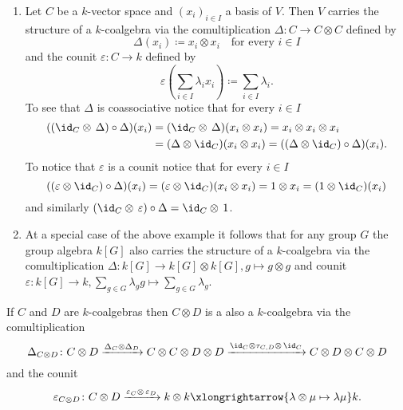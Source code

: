 \begin{expls}
 \begin{enumerate}[leftmargin=*]
  \item
   Let $C$ be a $k$-vector space and $(x_i)_{i \in I}$ a basis of $V$. Then $V$ carries the structure of a $k$-coalgebra via the comultiplication $\Delta \colon C \to C \otimes C$ defined by
   \[
    \Delta(x_i) \coloneqq x_i \otimes x_i \quad \text{for every $i \in I$}
   \]
   and the counit $\varepsilon \colon C \to k$ defined by
   \[
    \varepsilon\left( \sum_{i \in I} \lambda_i x_i \right) \coloneqq \sum_{i \in I} \lambda_i.
   \]
   To see that $\Delta$ is coassociative notice that for every $i \in I$
   \begin{align*}
     ((\id_C \otimes\, \Delta) \circ \Delta)(x_i)
     &= (\id_C \otimes\, \Delta)(x_i \otimes x_i)
     = x_i \otimes x_i \otimes x_i \\
     &= (\Delta \otimes \id_C)(x_i \otimes x_i)
     = ((\Delta \otimes \id_C) \circ \Delta)(x_i).
   \end{align*}
   To notice that $\varepsilon$ is a counit notice that for every $i \in I$
   \[
     ((\varepsilon \otimes \id_C) \circ \Delta)(x_i)
     = (\varepsilon \otimes \id_C)(x_i \otimes x_i)
     = 1 \otimes x_i
     = (1 \otimes \id_C)(x_i)
   \]
   and similarly $(\id_C \otimes\, \varepsilon) \circ \Delta = \id_C \otimes\, 1$.
   
  \item
   At a special case of the above example it follows that for any group $G$ the group algebra $k[G]$ also carries the structure of a $k$-coalgebra via the comultiplication $\Delta \colon k[G] \to k[G] \otimes k[G], g \mapsto g \otimes g$ and counit $\varepsilon \colon k[G] \to k, \sum_{g \in G} \lambda_g g \mapsto \sum_{g \in G} \lambda_g$.
 \end{enumerate}
\end{expls}


\begin{expl}
 If $C$ and $D$ are $k$-coalgebras then $C \otimes D$ is a also a $k$-coalgebra via the comultiplication
 \[
  \Delta_{C \otimes D} \colon
  C \otimes D
  \xrightarrow{\Delta_C \otimes \Delta_D}
  C \otimes C \otimes D \otimes D
  \xrightarrow{\id_C \otimes \tau_{C,D} \otimes\, \id_C}
  C \otimes D \otimes C \otimes D
 \]
 and the counit
 \[
  \varepsilon_{C \otimes D} \colon
  C \otimes D
  \xrightarrow{\varepsilon_C \otimes\, \varepsilon_D}
  k \otimes k
  \xlongrightarrow{\lambda \otimes \mu \mapsto \lambda \mu}
  k.
 \]
\end{expl}


